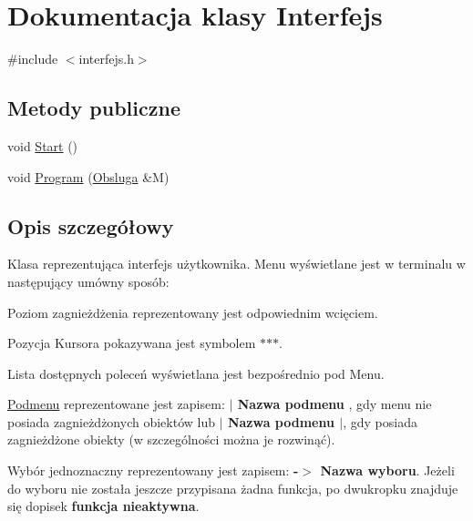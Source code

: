 \hypertarget{classInterfejs}{\section{Dokumentacja klasy Interfejs}
\label{classInterfejs}
}


{\ttfamily \#include $<$interfejs.\-h$>$}

\subsection*{Metody publiczne}
\begin{DoxyCompactItemize}
\item 
void \hyperlink{classInterfejs_ab016a2fdc6ba2553378167d6a07f8ea3}{Start} ()
\item 
void \hyperlink{classInterfejs_a46d175ac6f4e02e5e60fea8bb54c98b7}{Program} (\hyperlink{classObsluga}{Obsluga} \&M)
\end{DoxyCompactItemize}


\subsection{Opis szczegółowy}
Klasa reprezentująca interfejs użytkownika. Menu wyświetlane jest w terminalu w następujący umówny sposób\-:
\begin{DoxyItemize}
\item Poziom zagnieżdżenia reprezentowany jest odpowiednim wcięciem.
\item Pozycja Kursora pokazywana jest symbolem $\ast$$\ast$$\ast$.
\item Lista dostępnych poleceń wyświetlana jest bezpośrednio pod Menu.
\item \hyperlink{classPodmenu}{Podmenu} reprezentowane jest zapisem\-: {\bfseries $\vert$ Nazwa podmenu }, gdy menu nie posiada zagnieżdżonych obiektów lub {\bfseries $\vert$ Nazwa podmenu $\vert$}, gdy posiada zagnieżdżone obiekty (w szczególności można je rozwinąć).
\item Wybór jednoznaczny reprezentowany jest zapisem\-: {\bfseries -\/$>$ Nazwa wyboru}. Jeżeli do wyboru nie została jeszcze przypisana żadna funkcja, po dwukropku znajduje się dopisek {\bfseries funkcja nieaktywna}. 
\end{DoxyItemize}

